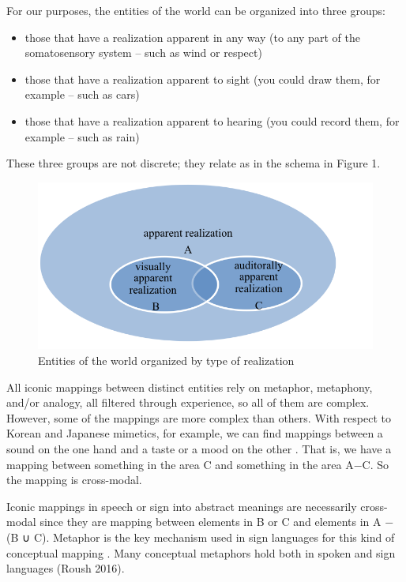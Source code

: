 \documentclass[output=paper,
modfonts
]{LSP/langsci}
\begin{document}
For our purposes, the entities of the world can be organized into three
groups:

\begin{itemize}
\item
  those that have a realization apparent in any way (to any part of the
  somatosensory system -- such as wind or respect)
\item
  those that have a realization apparent to sight (you could draw them,
  for example -- such as cars)
\item
  those that have a realization apparent to hearing (you could record
  them, for example -- such as rain)
\end{itemize}

These three groups are not discrete; they relate as in the schema in
Figure 1.

\begin{figure}
\includegraphics{napoli_fig1}
\caption{Entities of the world organized by type of
realization}
\label{fig:1}
\end{figure}

All iconic mappings between distinct entities rely on metaphor,
metaphony, and/or analogy, all filtered through experience, so all of
them are complex. However, some of the mappings are more complex than
others. With respect to Korean and Japanese mimetics, for example, we
can find mappings between a sound on the one hand and a taste or a mood
on the other \citep{garrigues1995,iwasaki2013}. That is, we have a
mapping between something in the area C and something in the area A−C.
So the mapping is cross-modal.

Iconic mappings in speech or sign into abstract meanings are necessarily
cross-modal since they are mapping between elements in B or C and
elements in A − (B ∪ C). Metaphor is the key mechanism used in sign
languages for this kind of conceptual mapping \citep{borghi2014}. Many
conceptual metaphors hold both in spoken and sign languages (Roush
2016).
\end{document}
